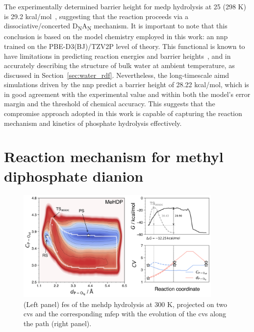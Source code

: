 The experimentally determined barrier height for \ac{medp} hydrolysis at 25 (298 K) is 29.2 kcal/mol~\citep{wolfendenDegreesDifficultyWaterConsuming2006}, suggesting that the reaction proceeds via a dissociative/concerted D\textsubscript{N}A\textsubscript{N} mechanism. It is important to note that this conclusion is based on the model chemistry employed in this work: an \ac{nnp} trained on the PBE-D3(BJ)/TZV2P level of theory. This functional is known to have limitations in predicting reaction energies and barrier heights~\citep{burschBestPracticeDFTProtocols2022}, and in accurately describing the structure of bulk water at ambient temperature, as discussed in Section~\ref{sec:water_rdf}. Nevertheless, the long-timescale \ac{aimd} simulations driven by the \ac{nnp} predict a barrier height of 28.22 kcal/mol, which is in good agreement with the experimental value and within both the model’s error margin and the threshold of chemical accuracy. This suggests that the compromise approach adopted in this work is capable of capturing the reaction mechanism and kinetics of phosphate hydrolysis effectively.



\section{Reaction mechanism for methyl diphosphate dianion}




\begin{figure}[hb]
    \centering
    \includegraphics[width=0.9\textwidth]{Figures/4_Results/results_MeHDP_300K_fes_mfep.png}
    \caption{(Left panel) \ac{fes} of the \ac{mehdp} hydrolysis at 300 K, projected on two \acp{cv} and the corresponding \ac{mfep} with the evolution of the \acp{cv} along the path (right panel).}
    \label{fig:mehdp_300k_fes_mfep}
\end{figure}

